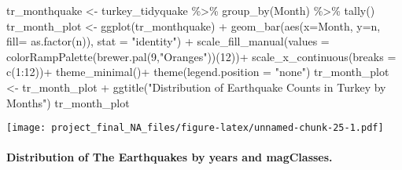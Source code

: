 \documentclass[
]{article}
\newenvironment{Shaded}{\begin{snugshade}}{\end{snugshade}}
\newcommand{\AttributeTok}[1]{\textcolor[rgb]{0.77,0.63,0.00}{#1}}
\newcommand{\DecValTok}[1]{\textcolor[rgb]{0.00,0.00,0.81}{#1}}
\newcommand{\FunctionTok}[1]{\textcolor[rgb]{0.00,0.00,0.00}{#1}}
\newcommand{\NormalTok}[1]{#1}
\newcommand{\OtherTok}[1]{\textcolor[rgb]{0.56,0.35,0.01}{#1}}
\newcommand{\SpecialCharTok}[1]{\textcolor[rgb]{0.00,0.00,0.00}{#1}}
\newcommand{\StringTok}[1]{\textcolor[rgb]{0.31,0.60,0.02}{#1}}
\begin{document}
\begin{Shaded}
\begin{Highlighting}[]
\NormalTok{tr\_monthquake }\OtherTok{\textless{}{-}}\NormalTok{ turkey\_tidyquake }\SpecialCharTok{\%\textgreater{}\%} 
                  \FunctionTok{group\_by}\NormalTok{(Month) }\SpecialCharTok{\%\textgreater{}\%} 
                  \FunctionTok{tally}\NormalTok{()}
\NormalTok{tr\_month\_plot }\OtherTok{\textless{}{-}} \FunctionTok{ggplot}\NormalTok{(tr\_monthquake) }\SpecialCharTok{+} \FunctionTok{geom\_bar}\NormalTok{(}\FunctionTok{aes}\NormalTok{(}\AttributeTok{x=}\NormalTok{Month, }\AttributeTok{y=}\NormalTok{n, }\AttributeTok{fill=} \FunctionTok{as.factor}\NormalTok{(n)),}
                                                  \AttributeTok{stat =} \StringTok{"identity"}\NormalTok{) }\SpecialCharTok{+}
                  \FunctionTok{scale\_fill\_manual}\NormalTok{(}\AttributeTok{values =} \FunctionTok{colorRampPalette}\NormalTok{(}\FunctionTok{brewer.pal}\NormalTok{(}\DecValTok{9}\NormalTok{,}\StringTok{"Oranges"}\NormalTok{))(}\DecValTok{12}\NormalTok{))}\SpecialCharTok{+}
                  \FunctionTok{scale\_x\_continuous}\NormalTok{(}\AttributeTok{breaks =} \FunctionTok{c}\NormalTok{(}\DecValTok{1}\SpecialCharTok{:}\DecValTok{12}\NormalTok{))}\SpecialCharTok{+}
                  \FunctionTok{theme\_minimal}\NormalTok{()}\SpecialCharTok{+}
                  \FunctionTok{theme}\NormalTok{(}\AttributeTok{legend.position =} \StringTok{"none"}\NormalTok{)}
\NormalTok{tr\_month\_plot }\OtherTok{\textless{}{-}}\NormalTok{ tr\_month\_plot }\SpecialCharTok{+} 
                  \FunctionTok{ggtitle}\NormalTok{(}\StringTok{"Distribution of Earthquake Counts in Turkey by Months"}\NormalTok{)}
\NormalTok{tr\_month\_plot}
\end{Highlighting}
\end{Shaded}

\texttt{[image: project\_final\_NA\_files/figure-latex/unnamed-chunk-25-1.pdf]}

\hypertarget{distribution-of-the-earthquakes-by-years-and-magclasses.}{%
\paragraph{Distribution of The Earthquakes by years and
magClasses.}\label{distribution-of-the-earthquakes-by-years-and-magclasses.}}
\end{document}
